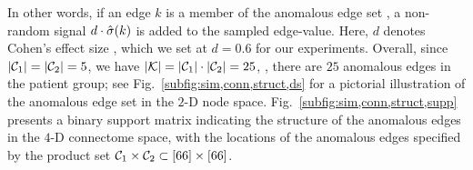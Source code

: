 In other words, if an edge $k$ is a member of the anomalous edge set \calK, a non-random signal $d\cdot\hat{\sigma}(k)$ is added to the sampled edge-value.
Here, $d$ denotes Cohen's effect size \citep{Cohen:1988}, which we set at $d=0.6$ for our experiments.
Overall, since $\left| \mathcal{C}_1 \right|=\left| \mathcal{C}_2 \right|=5$, we have $\left| \mathcal{K} \right|=\left| \mathcal{C}_1 \right|\cdot\left| \mathcal{C}_2 \right|=25$, \ie, there are $25$ anomalous edges in the patient group; see Fig.~\ref{subfig:sim,conn,struct,ds} for a pictorial illustration of the anomalous edge set \calK in the $2$-D node space.
Fig.~\ref{subfig:sim,conn,struct,supp} presents a binary support matrix indicating the structure of the anomalous edges in the $4$-D connectome space, with the locations of the anomalous edges specified by the product set $\mathcal{C}_1\times \mathcal{C}_2\subset[66]\times[66]$. 

